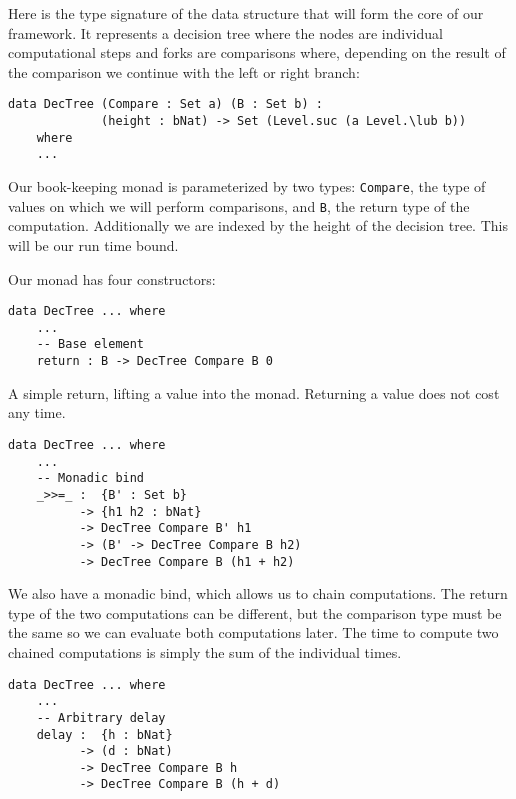 Here is the type signature of the data structure that will form the core of our framework. It represents a decision tree where the nodes are individual computational steps and forks are comparisons where, depending on the result of the comparison we continue with the left or right branch:

\begin{lstlisting}[caption={The DecTree monad (signature)},label={lst:dectree:1},emph={DecTree,Set,Level}]
data DecTree (Compare : Set a) (B : Set b) :
             (height : bNat) -> Set (Level.suc (a Level.\lub b))
    where
    ...
\end{lstlisting}

Our book-keeping monad is parameterized by two types: \texttt{Compare}, the type of values on which we will perform comparisons, and \texttt{B}, the return type of the computation. Additionally we are indexed by the height of the decision tree. This will be our run time bound.

Our monad has four constructors:

\begin{lstlisting}[caption={The DecTree monad (base constructor)},label={lst:dectree:2},emph={DecTree,return}]
data DecTree ... where
    ...
    -- Base element
    return : B -> DecTree Compare B 0
\end{lstlisting}

A simple return, lifting a value into the monad. Returning a value does not cost any time.

\begin{lstlisting}[caption={The DecTree monad (bind)},label={lst:dectree:3},emph={DecTree}]
data DecTree ... where
    ...
    -- Monadic bind
    _>>=_ :  {B' : Set b}
          -> {h1 h2 : bNat}
          -> DecTree Compare B' h1
          -> (B' -> DecTree Compare B h2)
          -> DecTree Compare B (h1 + h2)
\end{lstlisting}

We also have a monadic bind, which allows us to chain computations. The return type of the two computations can be different, but the comparison type must be the same so we can evaluate both computations later. The time to compute two chained computations is simply the sum of the individual times.

\begin{lstlisting}[caption={The DecTree monad (delay)},label={lst:dectree:4},emph={DecTree,delay}]
data DecTree ... where
    ...
    -- Arbitrary delay
    delay :  {h : bNat}
          -> (d : bNat)
          -> DecTree Compare B h
          -> DecTree Compare B (h + d)
\end{lstlisting}

